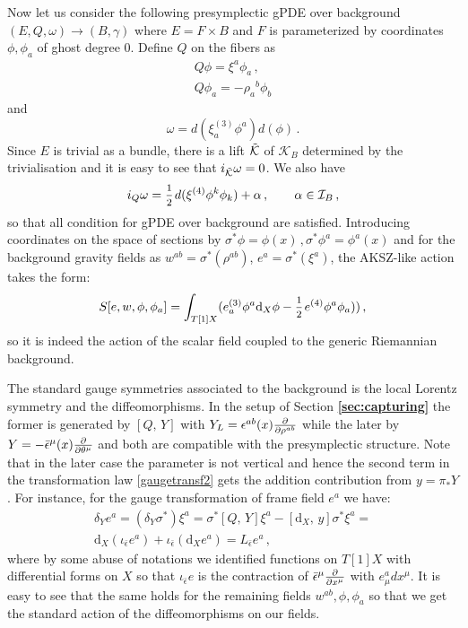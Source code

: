 \documentclass[a4paper,12pt]{article}
\numberwithin{equation}{section} %
\newcommand{\bref}[1]{\textbf{\ref{#1}}}
\newcommand{\dx}{\mathrm{d}_X}
\renewcommand{\d}{\partial}
\newcommand{\commut}[2]{[#1{,}\,#2]}
\newcommand{\half}{\mathchoice{%
    \ffrac{1}{2}}{\frac{1}{2}}{\frac{1}{2}}{\frac{1}{2}}}
\newcommand{\ffrac}[2]{\raisebox{.5pt}%
  {\footnotesize$\displaystyle\frac{#1}{#2}$}\kern1pt}
\newcommand{\dl}[1]{\mathchoice{\ffrac{\d}{\d #1}}{\frac{\d}{\d #1}}{\ffrac{\d}{\d #1}}{\ffrac{\d}{\d #1}}}
\def\cI{\mathcal{I}}
\def\cK{\mathcal{K}}
\newcommand{\lorcon}{w}
\begin{document}
Now let us consider the following presymplectic gPDE over background $(E,Q, \omega) \rightarrow (B,\gamma)$ where $E = F \times B$ and $F$ is parameterized by coordinates $\phi, \phi_a$ of ghost degree 0. Define $Q$ on the fibers as
\begin{equation}
\begin{gathered}
    Q \phi = \xi^a \phi_a\,, \\ 
    Q \phi_a = - \rho_a{}^b\phi_b
\end{gathered}
\end{equation}
and 
\begin{equation}
    \omega = d({\xi}^{{(3)}}_a \phi^a)d(\phi)\,.
\end{equation}
Since $E$ is trivial as a bundle, there is a lift $\Tilde{\cK}$ of $\cK_B$ determined by the trivialisation and it is easy to see that $i_{\Tilde{\cK}}\omega = 0 $. We also have
\begin{equation}
    i_Q\omega =  \half d({\xi}^{(4)}\phi^k\phi_k) + \alpha\,,\qquad \alpha \in \cI_B\,,
\end{equation}
so that all condition for gPDE over background are satisfied. Introducing coordinates on the space of sections by $\sigma^*\phi = \phi(x)\,,\sigma^*\phi^a = \phi^a(x)$ and for the background gravity fields as $\lorcon^{ab}=\sigma^*(\rho^{ab})$, $e^a=\sigma^*(\xi^{a})$, the AKSZ-like action takes the form:
\begin{equation}
S[e,\lorcon,\phi,\phi_a]=\int_{T[1]X}(e^{(3)}_a \phi^a\dx \phi - \half e^{(4)} \phi^a \phi_a))\,,
\end{equation}
so it is indeed the action of the scalar field coupled to the generic Riemannian background. 

The standard gauge symmetries associated to the background is the local Lorentz symmetry and the diffeomorphisms. In the setup of Section \bref{sec:capturing} the former is generated by  $\commut{Q}{Y}$ with $Y_L=\epsilon^{ab}(x)\dl{\rho^{ab}}$ while the later by $Y=-{\bar\epsilon}^\mu(x)\dl{\theta^\mu}$ and both are compatible with the presymplectic structure. Note that in the later case the parameter is not vertical and hence the second term in the transformation law \eqref{gaugetransf2} gets the addition contribution from $y=\pi_*Y$. For instance, for the gauge transformation of frame field $e^a$ we have:
\begin{multline}
\delta_Y e^a =(\delta_Y\sigma^* )\xi^a=\sigma^*\commut{Q}{Y}\xi^a-\commut{\dx}{y} \sigma^* \xi^a =
\\
\dx(\iota_{\bar\epsilon} e^a) + \iota_{\bar\epsilon} (\dx e^a)=L_{\bar\epsilon} e^a
\,,
\end{multline}
where by some abuse of notations we identified functions on $T[1]X$ with differential forms on $X$ so that
$\iota_{\bar\epsilon} e$ is the contraction of $\bar\epsilon^\mu\dl{x^\mu}$ with $e^a_\mu dx^\mu$.  It is easy to see that the same holds for the remaining fields $\lorcon^{ab},\phi,\phi_a$ so that we get the standard action of the diffeomorphisms on our fields. 
\end{document}
